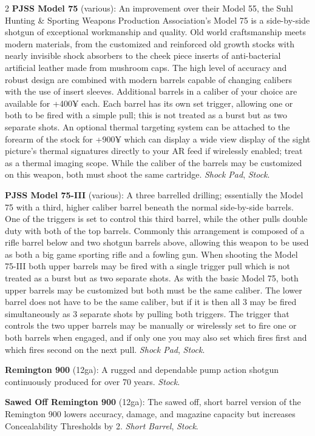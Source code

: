 \documentclass[
  oneside]{article}
\begin{document}
\begin{multicols}{2}
\textbf{PJSS Model 75} (various): An improvement
over their Model 55, the Suhl Hunting \& Sporting
Weapons Production Association's Model 75 is a
side-by-side shotgun of exceptional workmanship
and quality. Old world craftsmanship meets modern
materials, from the customized and reinforced old
growth stocks with nearly invisible shock
absorbers to the cheek piece inserts of
anti-bacterial artificial leather made from
mushroom caps. The high level of accuracy and
robust design are combined with modern barrels
capable of changing calibers with the use of
insert sleeves. Additional barrels in a caliber of
your choice are available for +400¥ each. Each
barrel has its own set trigger, allowing one or
both to be fired with a simple pull; this is not
treated as a burst but as two separate shots. An
optional thermal targeting system can be attached
to the forearm of the stock for +900¥ which can
display a wide view display of the sight picture's
thermal signatures directly to your AR feed if
wirelessly enabled; treat as a thermal imaging
scope. While the caliber of the barrels may be
customized on this weapon, both must shoot the
same cartridge. \emph{Shock Pad}, \emph{Stock}.

\textbf{PJSS Model 75-III} (various): A three
barrelled drilling; essentially the Model 75 with
a third, higher caliber barrel beneath the normal
side-by-side barrels. One of the triggers is set
to control this third barrel, while the other
pulls double duty with both of the top barrels.
Commonly this arrangement is composed of a rifle
barrel below and two shotgun barrels above,
allowing this weapon to be used as both a big game
sporting rifle and a fowling gun. When shooting
the Model 75-III both upper barrels may be fired
with a single trigger pull which is not treated as
a burst but as two separate shots. As with the
basic Model 75, both upper barrels may be
customized but both must be the same caliber. The
lower barrel does not have to be the same caliber,
but if it is then all 3 may be fired
simultaneously as 3 separate shots by pulling both
triggers. The trigger that controls the two upper
barrels may be manually or wirelessly set to fire
one or both barrels when engaged, and if only one
you may also set which fires first and which fires
second on the next pull. \emph{Shock Pad},
\emph{Stock}.

\textbf{Remington 900} (12ga): A rugged and
dependable pump action shotgun continuously
produced for over 70 years. \emph{Stock}.

\textbf{Sawed Off Remington 900} (12ga): The sawed
off, short barrel version of the Remington 900
lowers accuracy, damage, and magazine capacity but
increases Concealability Thresholds by 2.
\emph{Short Barrel}, \emph{Stock}.


\end{multicols}
\end{document}
